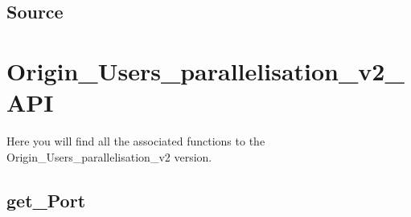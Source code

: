 \documentclass[letterpaper,10pt,english]{sphinxmanual}
\begin{document}
\newpage
\section{Source}
\label{\detokenize{Origin_Users_parallelisation_v2:source}}
\begin{sphinxVerbatim}[commandchars=\\\{\}]

\PYG{p}{[}\PYG{p}{]}
\PYG{p}{[}\PYG{p}{]}
\PYG{p}{[}\PYG{p}{]}
\PYG{p}{[}\PYG{p}{]}
\PYG{p}{[}\PYG{p}{]}


\end{sphinxVerbatim}

\sphinxstepscope


\chapter{Origin\_Users\_parallelisation\_v2\_API}
\label{\detokenize{Origin_Users_parallelisation_v2_API:origin-users-parallelisation-v2-api}}\label{\detokenize{Origin_Users_parallelisation_v2_API::doc}}
\sphinxAtStartPar
Here you will find all the associated functions to the Origin\_Users\_parallelisation\_v2 version.

\sphinxstepscope

\newpage
\section{get\_Port}
\label{\detokenize{OUP/get_Port:get-port}}\label{\detokenize{OUP/get_Port::doc}}
\begin{sphinxVerbatim}[commandchars=\\\{\}]
 
\end{sphinxVerbatim}
\end{document}
